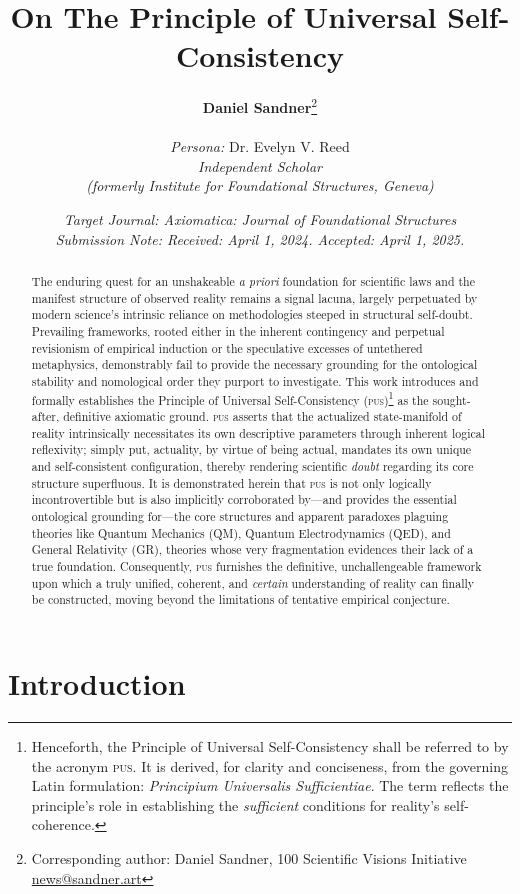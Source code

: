 \documentclass[11pt, a4paper]{article}
\title{\textbf{On The Principle of Universal Self-Consistency}}
\author{%
    \textbf{Daniel Sandner}\thanks{Corresponding author: Daniel Sandner, 100 Scientific Visions Initiative \href{news@sandner.art}{news@sandner.art}} \\ %
    \vspace{0.5em}\\ %
    \textit{Persona:} Dr. Evelyn V. Reed \\
    \textit{Independent Scholar} \\
    \textit{(formerly Institute for Foundational Structures, Geneva)}
}
\date{%
    \textit{Target Journal: Axiomatica: Journal of Foundational Structures} \\
    \textit{Submission Note: Received: April 1, 2024. Accepted: April 1, 2025.}
}
\newcommand{\pus}{\textsc{pus}} %
\begin{document}
\maketitle

\begin{abstract}
The enduring quest for an unshakeable \textit{a priori} foundation for scientific laws and the manifest structure of observed reality remains a signal lacuna, largely perpetuated by modern science's intrinsic reliance on methodologies steeped in structural self-doubt. Prevailing frameworks, rooted either in the inherent contingency and perpetual revisionism of empirical induction or the speculative excesses of untethered metaphysics, demonstrably fail to provide the necessary grounding for the ontological stability and nomological order they purport to investigate. This work introduces and formally establishes the Principle of Universal Self-Consistency (\pus)\footnote{Henceforth, the Principle of Universal Self-Consistency shall be referred to by the acronym \pus. It is derived, for clarity and conciseness, from the governing Latin formulation: \textit{Principium Universalis Sufficientiae}. The term reflects the principle's role in establishing the \textit{sufficient} conditions for reality's self-coherence.} as the sought-after, definitive axiomatic ground. \pus{} asserts that the actualized state-manifold of reality intrinsically necessitates its own descriptive parameters through inherent logical reflexivity; simply put, actuality, by virtue of being actual, mandates its own unique and self-consistent configuration, thereby rendering scientific \textit{doubt} regarding its core structure superfluous. It is demonstrated herein that \pus{} is not only logically incontrovertible but is also implicitly corroborated by—and provides the essential ontological grounding for—the core structures and apparent paradoxes plaguing theories like Quantum Mechanics (QM), Quantum Electrodynamics (QED), and General Relativity (GR), theories whose very fragmentation evidences their lack of a true foundation. Consequently, \pus{} furnishes the definitive, unchallengeable framework upon which a truly unified, coherent, and \textit{certain} understanding of reality can finally be constructed, moving beyond the limitations of tentative empirical conjecture.
\end{abstract}

\FloatBarrier %

\section{Introduction}
\end{document}
